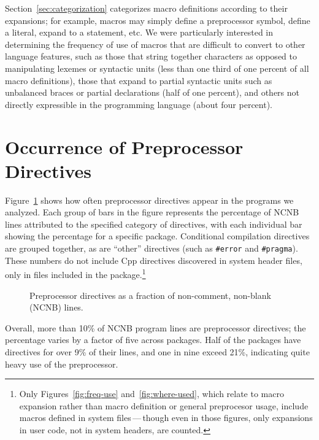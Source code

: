 \documentclass[11pt]{article}
\begin{document}
Section~\ref{sec:categorization} categorizes macro definitions according to
their expansions; for example, macros may simply define a preprocessor
symbol, define a literal, expand to a statement, etc.  We were particularly
interested in determining the frequency of use of macros that are difficult
to convert to other language features, such as those that string together
characters as opposed to manipulating lexemes or syntactic units (less than
one third of one percent of all macro definitions),
those that expand to partial syntactic units such as unbalanced
braces or partial declarations (half of one percent), and others not 
directly expressible in the programming language (about four percent).


\section{Occurrence of Preprocessor Directives}
\label{sec:directives}

Figure~\ref{fig:directives-breakdown} shows how often preprocessor
directives appear in the programs we analyzed.  Each group of bars in the
figure represents the percentage of NCNB lines attributed to the specified
category of directives, with each individual bar showing the percentage for
a specific package.  Conditional compilation directives are grouped together, as
are ``other'' directives (such as {\tt \#error} and {\tt \#pragma}).  These
numbers do not include Cpp directives discovered in system header files,
only in files included in the package.\footnote{Only
  Figures~\ref{fig:freq-use} and~\ref{fig:where-used}, which relate to
  macro expansion rather than macro definition or general preprocesor
  usage, include macros defined in system files\,---\,though even in those
  figures, only expansions in user code, not in system headers, are counted.}


\begin{figure}
\centerline{}
\caption{Preprocessor directives as a fraction of non-comment,
  non-blank (NCNB) lines.}
\label{fig:directives-breakdown}
\end{figure}

Overall, more than 10\% of NCNB program lines are preprocessor directives;
the percentage varies by a factor of five across packages.  Half of
the packages
have directives for over 9\% of their lines, and one in nine exceed 21\%,
indicating quite heavy use of the preprocessor.
\end{document}
